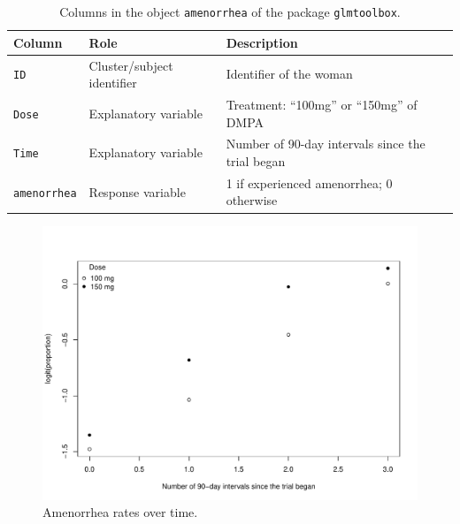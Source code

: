 \begin{table}[!ht]
{\small
\begin{center}
\begin{tabular}{lll} 
 \hline
Column &  Role   &  Description\\ \hline
{\tt ID}  & Cluster/subject identifier & Identifier of the woman\\
{\tt Dose} & Explanatory variable & Treatment: ``100mg'' or ``150mg'' of DMPA\\
{\tt Time} & Explanatory variable & Number of 90-day intervals since the trial began\\
{\tt amenorrhea} & Response variable & 1 if experienced amenorrhea; 0 otherwise\\ 
 \hline
\end{tabular}
\end{center}
\caption{Columns in the object {\tt amenorrhea} of the package {\tt glmtoolbox}.}
\label{am}}
\end{table}

\begin{figure}[h!]
\centering
\includegraphics[width=\textwidth]{am}
\caption{Amenorrhea rates over time.}
\label{am1}
\end{figure}


